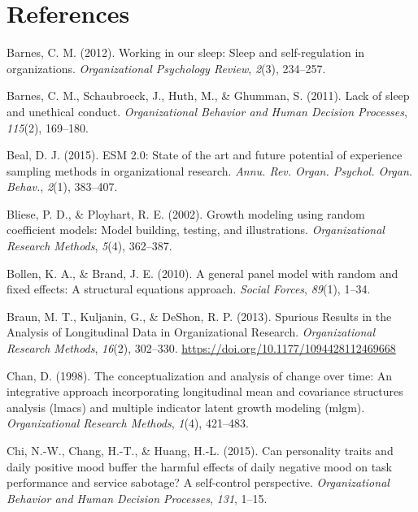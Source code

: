 \documentclass[english,,man]{apa6}
\begin{document}
\newpage

\hypertarget{references}{%
\section{References}\label{references}}

\setlength{\parindent}{-0.5in}
\setlength{\leftskip}{0.5in}

\hypertarget{refs}{}
\leavevmode\hypertarget{ref-barnes2012working}{}%
Barnes, C. M. (2012). Working in our sleep: Sleep and self-regulation in organizations. \emph{Organizational Psychology Review}, \emph{2}(3), 234--257.

\leavevmode\hypertarget{ref-barnes_lack_2011}{}%
Barnes, C. M., Schaubroeck, J., Huth, M., \& Ghumman, S. (2011). Lack of sleep and unethical conduct. \emph{Organizational Behavior and Human Decision Processes}, \emph{115}(2), 169--180.

\leavevmode\hypertarget{ref-beal_esm_2015}{}%
Beal, D. J. (2015). ESM 2.0: State of the art and future potential of experience sampling methods in organizational research. \emph{Annu. Rev. Organ. Psychol. Organ. Behav.}, \emph{2}(1), 383--407.

\leavevmode\hypertarget{ref-bliese_growth_2002}{}%
Bliese, P. D., \& Ployhart, R. E. (2002). Growth modeling using random coefficient models: Model building, testing, and illustrations. \emph{Organizational Research Methods}, \emph{5}(4), 362--387.

\leavevmode\hypertarget{ref-bollen_general_2010}{}%
Bollen, K. A., \& Brand, J. E. (2010). A general panel model with random and fixed effects: A structural equations approach. \emph{Social Forces}, \emph{89}(1), 1--34.

\leavevmode\hypertarget{ref-braun_spurious_2013}{}%
Braun, M. T., Kuljanin, G., \& DeShon, R. P. (2013). Spurious Results in the Analysis of Longitudinal Data in Organizational Research. \emph{Organizational Research Methods}, \emph{16}(2), 302--330. \url{https://doi.org/10.1177/1094428112469668}

\leavevmode\hypertarget{ref-chan1998conceptualization}{}%
Chan, D. (1998). The conceptualization and analysis of change over time: An integrative approach incorporating longitudinal mean and covariance structures analysis (lmacs) and multiple indicator latent growth modeling (mlgm). \emph{Organizational Research Methods}, \emph{1}(4), 421--483.

\leavevmode\hypertarget{ref-chi_can_2015}{}%
Chi, N.-W., Chang, H.-T., \& Huang, H.-L. (2015). Can personality traits and daily positive mood buffer the harmful effects of daily negative mood on task performance and service sabotage? A self-control perspective. \emph{Organizational Behavior and Human Decision Processes}, \emph{131}, 1--15.
\end{document}
